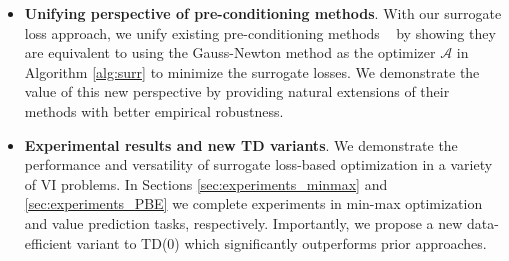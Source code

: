\documentclass{article} %
\theoremstyle{definition}
\newcommand{\reals}{\mathbb{R}}
\newcommand*\closure[1]{\operatorname{cl}#1}
\newcommand{\inner}[2]{\langle #1, #2 \rangle}
\begin{document}
\begin{itemize}[leftmargin=*]
    \item \textbf{Unifying perspective of pre-conditioning methods}.
        With our surrogate loss approach, we unify existing pre-conditioning methods ~\citep{bertsekas2009projected,mladenovic2022generalized,sakos2024exploiting} by showing they are equivalent to using the Gauss-Newton method as the optimizer $\mathcal{A}$ in Algorithm \ref{alg:surr} to minimize the surrogate losses.
        We demonstrate the value of this new perspective by providing natural extensions of their methods with better empirical robustness.

    \item \textbf{Experimental results and new TD variants}. We demonstrate the performance and versatility of surrogate loss-based optimization in a variety of VI problems. In Sections \ref{sec:experiments_minmax} and \ref{sec:experiments_PBE} we complete experiments in min-max optimization and value prediction tasks, respectively. Importantly, we propose a new data-efficient variant to TD(0) which significantly outperforms prior approaches.
\end{itemize}




\end{document}
